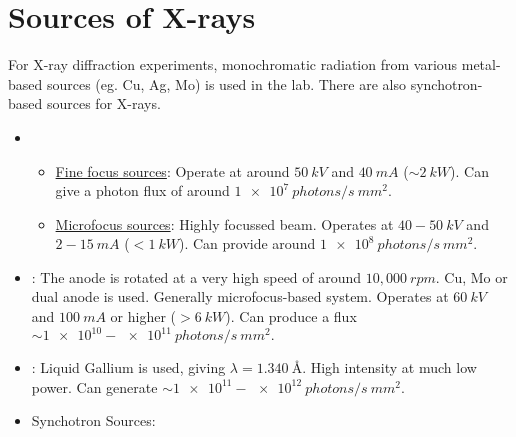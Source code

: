\section{Sources of X-rays}

	For X-ray diffraction experiments, monochromatic radiation from various metal-based sources (eg. Cu, Ag, Mo) is used in the lab. There are also synchotron-based sources for X-rays.%
%			
	\begin{itemize}%
%			
	    \item {}%
%			    	
	    	\begin{itemize}[label={$\hookrightarrow$}]%
%			    	
	    	    \item \ul{Fine focus sources}: Operate at around $50~\si{kV}$ and $40~\si{mA}$ ($\sim \SI{2}{kW}$). Can give a photon flux of around $\SI{1e7}{photons/s~mm^2}.$
	    	    
	    	    \item \ul{Microfocus sources}: Highly focussed beam. Operates at $40-50~\si{kV}$ and $2-15~\si{mA}$  ($<\SI{1}{kW}$). Can provide around $\SI{1e8}{photons/s~mm^2}.$
	    	    
	    	\end{itemize}
	    	
	    \item {}: The anode is rotated at a very high speed of around $10,000~\si{rpm}.$ Cu, Mo or dual anode is used. Generally microfocus-based system. Operates at $\SI{60}{kV}$ and $\SI{100}{mA}$ or higher ($> \SI{6}{kW}$). Can produce a flux $\sim \num{1e10}-\num{e11}~\si{photons/s~mm^2}.$
	    
	    \item {}: Liquid Gallium is used, giving $\lambda = \SI{1.340}{\angstrom}.$ High intensity at much low power. Can generate $\sim \num{1e11}-\num{e12}~\si{photons/s~mm^2}.$
	    
	    \item Synchotron Sources:
	    
	\end{itemize}